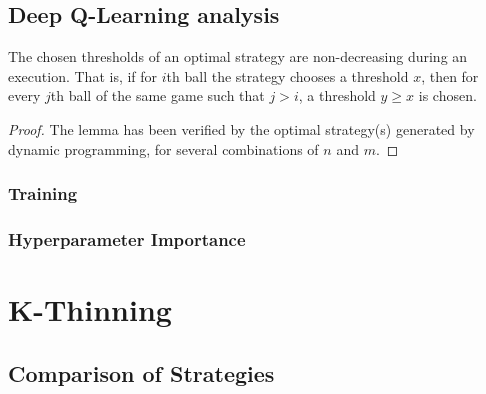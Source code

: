



\subsection{Deep Q-Learning analysis}


\begin{lemma}\label{lemma: two-thinning-increasing-threshold}
The chosen thresholds of an optimal strategy are non-decreasing during an execution. That is, if for $i$th ball the strategy chooses a threshold $x$, then for every $j$th ball of the same game such that $j>i$, a threshold $y\geq x$ is chosen.
\end{lemma}




\begin{proof}


The lemma has been verified by the optimal strategy(s) generated by dynamic programming, for several combinations of $n$ and $m$. 
\end{proof}


\subsubsection{Training}


\subsubsection{Hyperparameter Importance}



\section{K-Thinning}



\subsection{Comparison of Strategies}



